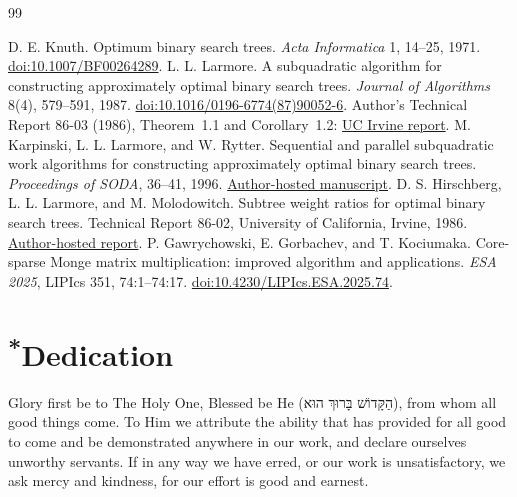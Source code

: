 \documentclass[11pt]{article}
\newcommand{\hebrewname}{{\hebrewfont\beginR הַקָּדוֹשׁ בָּרוּךְ הוּא\endR}}
\begin{document}
\clearpage
\begingroup\small
\begin{thebibliography}{99}
\raggedright
{}
D. E. Knuth. Optimum binary search trees.
\emph{Acta Informatica} 1, 14--25, 1971.
\href{https://doi.org/10.1007/BF00264289}{doi:10.1007/BF00264289}.
L. L. Larmore. A subquadratic algorithm for constructing approximately
optimal binary search trees. \emph{Journal of Algorithms} 8(4),
579--591, 1987.
\href{https://doi.org/10.1016/0196-6774(87)90052-6}{doi:10.1016/0196-6774(87)90052-6}.
Author's Technical Report 86-03 (1986), Theorem~1.1 and Corollary~1.2:
\href{https://escholarship.org/content/qt4v7249bv/qt4v7249bv.pdf}{UC Irvine report}.
M. Karpinski, L. L. Larmore, and W. Rytter.
Sequential and parallel subquadratic work algorithms for constructing
approximately optimal binary search trees. \emph{Proceedings of SODA},
36--41, 1996.
\href{https://theory.cs.uni-bonn.de/marek/publications/seq_and_par_subquadr.pdf}{Author-hosted manuscript}.
D. S. Hirschberg, L. L. Larmore, and M. Molodowitch.
Subtree weight ratios for optimal binary search trees. Technical Report
86-02, University of California, Irvine, 1986.
\href{https://ics.uci.edu/~dhirschb/pubs/TR86-02.pdf}{Author-hosted report}.
P. Gawrychowski, E. Gorbachev, and T. Kociumaka.
Core-sparse Monge matrix multiplication: improved algorithm and applications.
\emph{ESA 2025}, LIPIcs 351, 74:1--74:17.
\href{https://doi.org/10.4230/LIPIcs.ESA.2025.74}{doi:10.4230/LIPIcs.ESA.2025.74}.
\end{thebibliography}
\endgroup

\clearpage
\section*{\textsuperscript{*}Dedication}
Glory first be to The Holy One, Blessed be He (\hebrewname), from whom all good things come.  To Him we attribute the ability that has provided for all good to come and be demonstrated anywhere in our work,
and declare ourselves unworthy servants. If in any way we have erred, or our work is unsatisfactory,
we ask mercy and kindness, for our effort is good and earnest.
\end{document}

